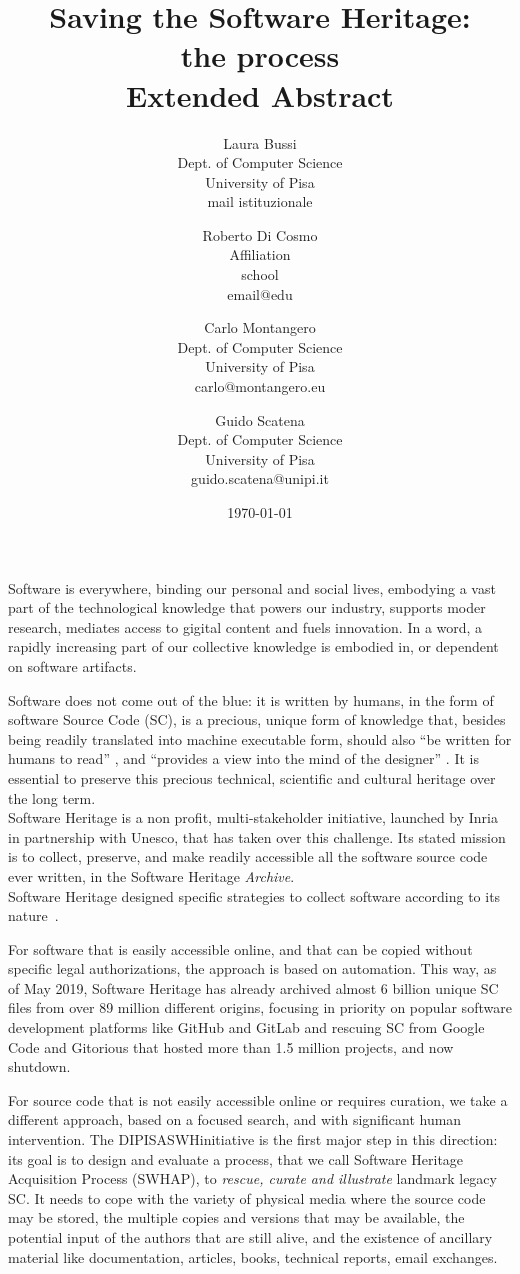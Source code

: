 \documentclass[a4paper]{article}
\title{Saving the Software Heritage:
				\\ the process  
				\\ 	\large Extended Abstract
}
\author{
    Laura Bussi\\
    Dept. of Computer Science\\
    University of Pisa\\
    mail istituzionale
	\and
    Roberto Di Cosmo\\
    Affiliation\\
    school\\
    email@edu
  \and
    Carlo Montangero\\
    Dept. of Computer Science\\
    University of Pisa\\
    carlo@montangero.eu
  \and
    Guido Scatena\\
		Dept. of Computer Science\\
    University of Pisa\\
    guido.scatena@unipi.it
}
\date{\today}
\newcommand{\DIPISASWHinitiative}{DIPISASWHinitiative }
\begin{document}
\maketitle

\noindent              
Software is everywhere,  binding our personal and social lives, embodying a vast part of the technological knowledge that powers our industry, supports moder research, mediates access to gigital content and fuels innovation. In a word, a rapidly increasing part of our collective knowledge is embodied in, or dependent on software artifacts. 

Software does not come out of the blue: it is written by humans, in the form of software Source Code (SC), is a precious, unique form of knowledge that, besides being readily translated into machine executable form, should also "`be written for humans to read"' \cite{AbelsonS85}, and "`provides a view into the mind of the designer"' \cite{Shustek06}. It is essential to preserve this precious technical, scientific and cultural heritage over the long term.\\

\noindent
Software Heritage is a non profit, multi-stakeholder initiative, launched by Inria in partnership with Unesco, that has taken over this challenge. Its stated mission is to collect, preserve, and make readily accessible all the software source code ever written, in the Software Heritage \emph{Archive}.\\

Software Heritage designed specific strategies to collect software according to its nature~\cite{swhcacm2018}. 

For software that is easily accessible online, and that can be copied without specific legal authorizations, the approach is based on automation. This way, as of May 2019, Software Heritage has already archived almost 6 billion unique SC files from over 89 million different origins, focusing in priority on popular software development platforms like GitHub and GitLab and rescuing SC from Google Code and Gitorious that hosted more than 1.5 million projects, and now shutdown.

For source code that is not easily accessible online or requires curation, we take a different approach, based on a focused search, and with significant human intervention. The \DIPISASWHinitiative is the first major step in this direction: its goal is to design and evaluate a process, that we call Software Heritage Acquisition Process (SWHAP), to \emph{rescue, curate and illustrate} landmark legacy SC. It needs to cope with the variety of physical media where the source code may be stored, the multiple copies and versions that may be available, the potential input of the authors that are still alive, and the existence of ancillary material like documentation, articles, books, technical reports, email exchanges.\\
\end{document}
